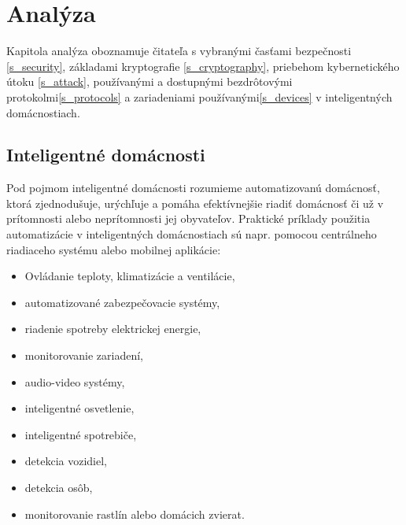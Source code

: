 \documentclass[12pt,a4paper,oneside,openright]{report}
\begin{document}



\chapter{Analýza} \label{s_analyza}
Kapitola analýza oboznamuje čitateľa s vybranými časťami bezpečnosti \ref{s_security}, základami kryptografie \ref{s_cryptography}, priebehom kybernetického útoku \ref{s_attack}, používanými a dostupnými bezdrôtovými protokolmi\ref{s_protocols} a zariadeniami používanými\ref{s_devices} v inteligentných domácnostiach.

\section{Inteligentné domácnosti} \label{s_inteligent_house}
Pod pojmom inteligentné domácnosti rozumieme automatizovanú domácnosť, ktorá zjednodušuje, urýchľuje a pomáha efektívnejšie riadiť domácnosť či už v prítomnosti alebo neprítomnosti jej obyvateľov.
Praktické príklady použitia automatizácie v inteligentných domácnostiach sú napr. pomocou centrálneho riadiaceho systému alebo mobilnej aplikácie: \cite{cleverism}
\begin{itemize}
	\item Ovládanie teploty, klimatizácie a ventilácie,
	\item automatizované zabezpečovacie systémy,
	\item riadenie spotreby elektrickej energie,
	\item monitorovanie zariadení,
	\item audio-video systémy,
	\item inteligentné osvetlenie,
	\item inteligentné spotrebiče,
	\item detekcia vozidiel,
	\item detekcia osôb,
	\item monitorovanie rastlín alebo domácich zvierat.
\end{itemize}
\onehalfspacing
\end{document}
